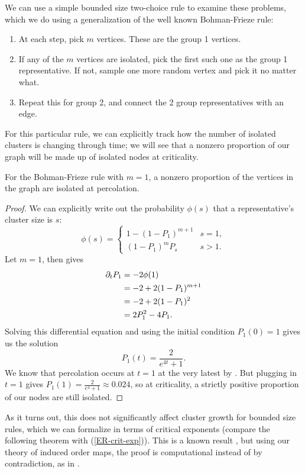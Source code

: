 \documentclass[twoside,10pt]{article}
\newcommand{\BF}{Bohman-Frieze\xspace}
\begin{document}
We can use a simple bounded size two-choice rule to examine these problems, which we do using a generalization of the well known \BF rule:
\begin{enumerate}
        \item At each step, pick $m$ vertices. These are the group 1 vertices.         \item If any of the $m$ vertices are isolated, pick the first such one as the group 1 representative. If not, sample one more random vertex and pick it no matter what.
        \item Repeat this for group 2, and connect the 2 group representatives with an edge.
\end{enumerate}
For this particular rule, we can explicitly track how the number of isolated clusters is changing through time; we will see that a nonzero proportion of our graph will be made up of isolated nodes at criticality.
\begin{prop}[]
	\label{nonzero-at-criticality}
	For the \BF rule with $m=1$, a nonzero proportion of the vertices in the graph are isolated at percolation.
\end{prop}
\begin{proof}
 We can explicitly write out the probability $\phi(s)$ that a representative's cluster size is $s$:
\[
        \phi(s)=
        \begin{cases}
                1 - (1-P_1)^{m+1} & s = 1, \\
                (1-P_1)^{m}P_s & s > 1.
        \end{cases}
\]
Let $m=1$, then  gives
\begin{align*}
	\partial_{t}{P_1} &= -2 \phi(1) \\
                    &= -2 + 2(1-P_1)^{m+1} \\
                    &= -2 + 2(1-P_1)^{2} \\
                    &= 2P_1^{2} - 4P_1.
\end{align*}
Solving this differential equation and using the initial condition $P_1(0)=1$ gives us the solution
\[
        P_1(t) = \frac{2}{e^{4t}+1} .
\]
We know that percolation occurs at $t=1$ at the very latest by \cite{RW-cont}. But plugging in $t=1$ gives $P_1(1) = \frac{2}{e^{4}+1} \approx 0.024$, so at criticality, a strictly positive proportion of our nodes are still isolated.
\end{proof}

As it turns out, this does not significantly affect cluster growth for bounded size rules, which we can formalize in terms of critical exponents (compare the following theorem with (\ref{ER-crit-exp})). This is a known result \cite{RW-bounded}, but using our theory of induced order maps, the proof is computational instead of by contradiction, as in \cite{RW-bounded}.
\end{document}
